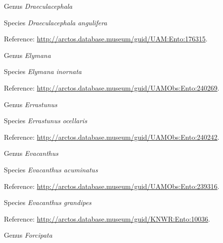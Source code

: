 \documentclass[9pt, article]{memoir}
\begin{document}
\begin{multicols}{2}
\vspace{6pt}\noindent\hspace{30pt}Genus \textit{Draeculacephala}


\vspace{6pt}\noindent\hspace{36pt}Species \textit{Draeculacephala angulifera}


\vspace{6pt}Reference: 
\url{http://arctos.database.museum/guid/UAM:Ento:176315}.

\vspace{6pt}\noindent\hspace{30pt}Genus \textit{Elymana}


\vspace{6pt}\noindent\hspace{36pt}Species \textit{Elymana inornata}


\vspace{6pt}Reference: 
\url{http://arctos.database.museum/guid/UAMObs:Ento:240269}.

\vspace{6pt}\noindent\hspace{30pt}Genus \textit{Errastunus}


\vspace{6pt}\noindent\hspace{36pt}Species \textit{Errastunus ocellaris}


\vspace{6pt}Reference: 
\url{http://arctos.database.museum/guid/UAMObs:Ento:240242}.

\vspace{6pt}\noindent\hspace{30pt}Genus \textit{Evacanthus}


\vspace{6pt}\noindent\hspace{36pt}Species \textit{Evacanthus acuminatus}


\vspace{6pt}Reference: 
\url{http://arctos.database.museum/guid/UAMObs:Ento:239316}.

\vspace{6pt}\noindent\hspace{36pt}Species \textit{Evacanthus grandipes}


\vspace{6pt}Reference: 
\url{http://arctos.database.museum/guid/KNWR:Ento:10036}.

\vspace{6pt}\noindent\hspace{30pt}Genus \textit{Forcipata}



\end{multicols}
\end{document}
